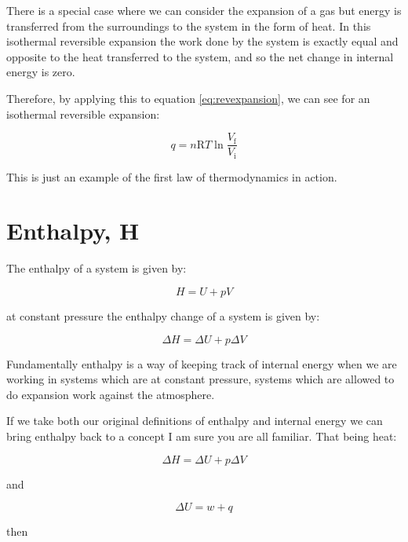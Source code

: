 \documentclass[
]{book}
\begin{document}
There is a special case where we can consider the expansion of a gas but energy is transferred from the surroundings to the system in the form of heat. In this isothermal reversible expansion the work done by the system is exactly equal and opposite to the heat transferred to the system, and so the net change in internal energy is zero.

Therefore, by applying this to equation \eqref{eq:revexpansion}, we can see for an isothermal reversible expansion:

\begin{equation}
q=n\textrm{R}T \ln {\frac{V_\textrm{f}}{V_\textrm{i}}}
\label{eq:isothermalexpansion}
\end{equation}

This is just an example of the first law of thermodynamics in action.

\hypertarget{enthalpy-h}{%
\section{Enthalpy, H}\label{enthalpy-h}}

The enthalpy of a system is given by:

\begin{equation}
H = U+pV
\label{eq:enthalpy}
\end{equation}

at constant pressure the enthalpy change of a system is given by:

\begin{equation}
\Delta H = \Delta U + p\Delta V
\label{eq:enthalpychange}
\end{equation}

Fundamentally enthalpy is a way of keeping track of internal energy when we are working in systems which are at constant pressure, systems which are allowed to do expansion work against the atmosphere.

If we take both our original definitions of enthalpy and internal energy we can bring enthalpy back to a concept I am sure you are all familiar. That being heat:

\begin{equation*}
\Delta H = \Delta U + p\Delta V
\end{equation*}

and

\begin{equation*}
\Delta U = w + q
\end{equation*}

then
\end{document}
